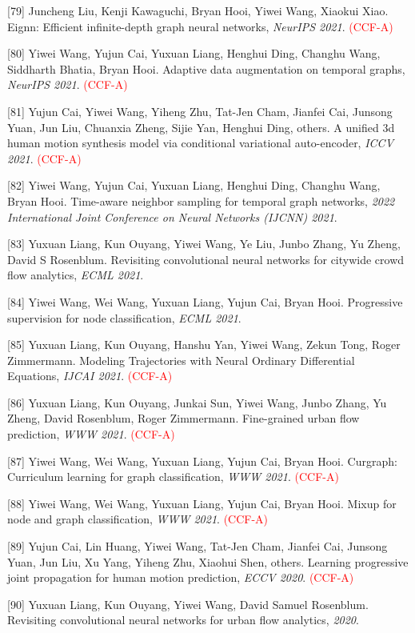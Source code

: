 [79] Juncheng Liu, Kenji Kawaguchi, Bryan Hooi, Yiwei Wang, Xiaokui Xiao. Eignn: Efficient infinite-depth graph neural networks, \textit{NeurIPS 2021}. \textcolor{red}{(CCF-A)}

[80] Yiwei Wang, Yujun Cai, Yuxuan Liang, Henghui Ding, Changhu Wang, Siddharth Bhatia, Bryan Hooi. Adaptive data augmentation on temporal graphs, \textit{NeurIPS 2021}. \textcolor{red}{(CCF-A)}

[81] Yujun Cai, Yiwei Wang, Yiheng Zhu, Tat-Jen Cham, Jianfei Cai, Junsong Yuan, Jun Liu, Chuanxia Zheng, Sijie Yan, Henghui Ding, others. A unified 3d human motion synthesis model via conditional variational auto-encoder, \textit{ICCV 2021}. \textcolor{red}{(CCF-A)}

[82] Yiwei Wang, Yujun Cai, Yuxuan Liang, Henghui Ding, Changhu Wang, Bryan Hooi. Time-aware neighbor sampling for temporal graph networks, \textit{2022 International Joint Conference on Neural Networks (IJCNN) 2021}.

[83] Yuxuan Liang, Kun Ouyang, Yiwei Wang, Ye Liu, Junbo Zhang, Yu Zheng, David S Rosenblum. Revisiting convolutional neural networks for citywide crowd flow analytics, \textit{ECML 2021}.

[84] Yiwei Wang, Wei Wang, Yuxuan Liang, Yujun Cai, Bryan Hooi. Progressive supervision for node classification, \textit{ECML 2021}.

[85] Yuxuan Liang, Kun Ouyang, Hanshu Yan, Yiwei Wang, Zekun Tong, Roger Zimmermann. Modeling Trajectories with Neural Ordinary Differential Equations, \textit{IJCAI 2021}. \textcolor{red}{(CCF-A)}

[86] Yuxuan Liang, Kun Ouyang, Junkai Sun, Yiwei Wang, Junbo Zhang, Yu Zheng, David Rosenblum, Roger Zimmermann. Fine-grained urban flow prediction, \textit{WWW 2021}. \textcolor{red}{(CCF-A)}

[87] Yiwei Wang, Wei Wang, Yuxuan Liang, Yujun Cai, Bryan Hooi. Curgraph: Curriculum learning for graph classification, \textit{WWW 2021}. \textcolor{red}{(CCF-A)}

[88] Yiwei Wang, Wei Wang, Yuxuan Liang, Yujun Cai, Bryan Hooi. Mixup for node and graph classification, \textit{WWW 2021}. \textcolor{red}{(CCF-A)}

[89] Yujun Cai, Lin Huang, Yiwei Wang, Tat-Jen Cham, Jianfei Cai, Junsong Yuan, Jun Liu, Xu Yang, Yiheng Zhu, Xiaohui Shen, others. Learning progressive joint propagation for human motion prediction, \textit{ECCV 2020}. \textcolor{red}{(CCF-A)}

[90] Yuxuan Liang, Kun Ouyang, Yiwei Wang, David Samuel Rosenblum. Revisiting convolutional neural networks for urban flow analytics, \textit{ 2020}.

